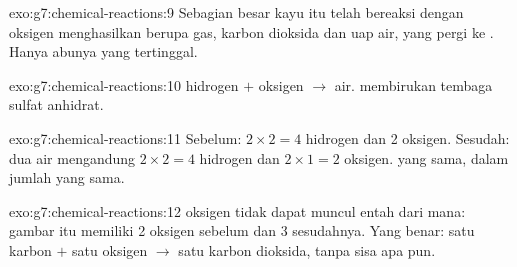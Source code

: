\begin{solution}{exo:g7:chemical-reactions:9}
Sebagian besar kayu itu telah bereaksi dengan oksigen menghasilkan
 berupa gas, karbon dioksida dan uap air, yang pergi ke
. Hanya abunya yang tertinggal.
\end{solution}

\begin{solution}{exo:g7:chemical-reactions:10}
hidrogen $+$ oksigen $\longrightarrow$ air.  membirukan
tembaga sulfat anhidrat.
\end{solution}

\begin{solution}{exo:g7:chemical-reactions:11}
Sebelum: $2 \times 2 = 4$  hidrogen dan 2  oksigen. Sesudah: dua
 air mengandung $2 \times 2 = 4$  hidrogen dan $2 \times 1 =
2$  oksigen.  yang sama, dalam jumlah yang sama.
\end{solution}

\begin{solution}{exo:g7:chemical-reactions:12}
 oksigen tidak dapat muncul entah dari mana: gambar itu memiliki 2
 oksigen sebelum dan 3 sesudahnya. Yang benar: satu  karbon $+$
satu  oksigen $\longrightarrow$ satu  karbon dioksida,
tanpa sisa apa pun.
\end{solution}


